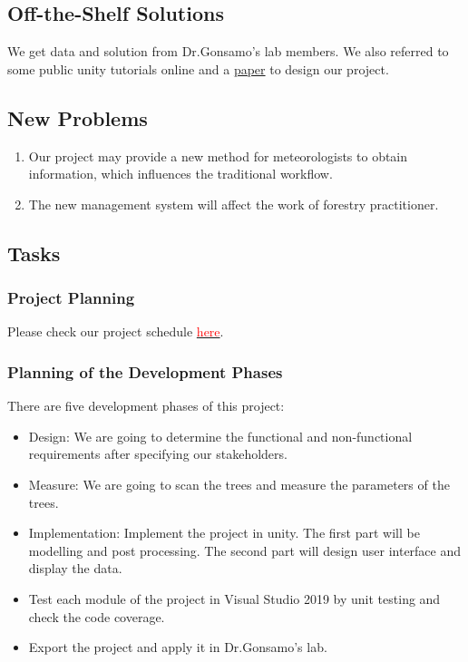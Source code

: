\documentclass{article}
\begin{document}
\subsection{Off-the-Shelf Solutions}
We get data and solution from Dr.Gonsamo's lab members.
We also referred to some public unity tutorials online and a \href{https://reader.elsevier.com/reader/sd/pii/S1569843222001881?token=0FD852C628FAE19CABA5E197E8D7ACFF3F2161E405D1A2EC950EE68C39EE00A59ACE7E27C22E4B86F3E04611242D7160&originRegion=us-east-1&originCreation=20220925224650}{paper}  to design our project. 
\subsection{New Problems}
\begin{enumerate}
    \item Our project may provide a new method for meteorologists to obtain information, which influences the traditional workflow. 
    \item The new management system will affect the work of forestry practitioner.
    
\end{enumerate}
\subsection{Tasks}
\subsubsection{Project Planning}
Please check our project schedule \href{https://github.com/wuj187/DigitalTwinCAS/tree/main/docs/DevelopmentPlan/Project_Schedule}{\textcolor{red}{here}}.
\subsubsection{Planning of the Development Phases}
There are five development phases of this project:
\begin{itemize}
    \item Design: We are going to determine the functional and non-functional requirements after specifying our stakeholders.
    \item Measure: We are going to scan the trees and measure the parameters of the trees.
    \item Implementation: Implement the project in unity. The first part will be modelling and post processing. The second part will design user interface and display the data.
    \item Test each module of the project in Visual Studio 2019 by unit testing and check the code coverage.
    \item Export the project and apply it in Dr.Gonsamo's lab.
\end{itemize}
\end{document}
